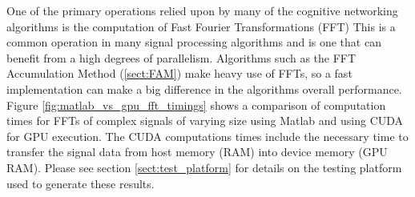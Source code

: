 One of the primary operations relied upon by many of the cognitive networking algorithms is the computation of Fast Fourier Transformations (FFT)  This is a common operation in many signal processing algorithms and is one that can benefit from a high degrees of parallelism.  Algorithms such as the FFT Accumulation Method (\ref{sect:FAM}) make heavy use of FFTs, so a fast implementation can make a big difference in the algorithms overall performance.  Figure \ref{fig:matlab_vs_gpu_fft_timings} shows a comparison of computation times for FFTs of complex signals of varying size using Matlab and using CUDA for GPU execution.  The CUDA computations times include the necessary time to transfer the signal data from host memory (RAM) into device memory (GPU RAM).  Please see section \ref{sect:test_platform} for details on the testing platform used to generate these results.

